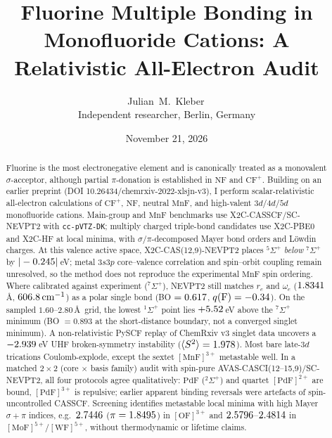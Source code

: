 \documentclass[10pt,twocolumn]{article}
\title{\textbf{Fluorine Multiple Bonding in Monofluoride Cations: A Relativistic All-Electron Audit}}
\author{Julian~M.~Kleber\,\orcidlink{0000-0001-5518-0932}\\
\small Independent researcher, Berlin, Germany}
\date{November 21, 2026}
\begin{document}

\maketitle

\begin{abstract}
Fluorine is the most electronegative element and is canonically treated as a monovalent $\sigma$-acceptor, although partial $\pi$-donation is established in $\mathrm{NF}$ and $\mathrm{CF}^+$. Building on an earlier preprint (DOI 10.26434/chemrxiv-2022-xlsjn-v3), I perform scalar-relativistic all-electron calculations of $\mathrm{CF}^+$, $\mathrm{NF}$, neutral $\mathrm{MnF}$, and high-valent $3d$/$4d$/$5d$ monofluoride cations. Main-group and $\mathrm{MnF}$ benchmarks use X2C-CASSCF/SC-NEVPT2 with \texttt{cc-pVTZ-DK}; multiply charged triple-bond candidates use X2C-PBE0 and X2C-HF at local minima, with $\sigma/\pi$-decomposed Mayer bond orders and L\"owdin charges. At this valence active space, X2C-CAS(12,9)-NEVPT2 places $^5\Sigma^+$ \emph{below} $^7\Sigma^+$ by $|-0.245|\,$eV; metal $3s3p$ core--valence correlation and spin--orbit coupling remain unresolved, so the method does not reproduce the experimental $\mathrm{MnF}$ spin ordering. Where calibrated against experiment ($^7\Sigma^+$), NEVPT2 still matches $r_e$ and $\omega_e$ ($1.8341$\,\AA, $606.8\,\mathrm{cm}^{-1}$) as a polar single bond (BO $=0.617$, $q(\mathrm{F})=-0.34$). On the sampled $1.60$--$2.80\,$\AA\ grid, the lowest $^1\Sigma^+$ point lies $+5.52\,$eV above the $^7\Sigma^+$ minimum (BO $= 0.893$ at the short-distance boundary, not a converged singlet minimum). A non-relativistic PySCF replay of ChemRxiv v3 singlet data uncovers a $-2.939\,$eV UHF broken-symmetry instability ($\langle S^2\rangle=1.978$). Most bare late-$3d$ trications Coulomb-explode, except the sextet $[\mathrm{MnF}]^{3+}$ metastable well. In a matched $2\times 2$ (core $\times$ basis family) audit with spin-pure AVAS-CASCI(12--15,9)/SC-NEVPT2, all four protocols agree qualitatively: $\mathrm{PdF}$ ($^2\Sigma^+$) and quartet $[\mathrm{PdF}]^{2+}$ are bound, $[\mathrm{PdF}]^{3+}$ is repulsive; earlier apparent binding reversals were artefacts of spin-uncontrolled CASSCF. Screening identifies metastable local minima with high Mayer $\sigma+\pi$ indices, e.g.\ $2.7446$ ($\pi=1.8495$) in $[\mathrm{OF}]^{3+}$ and $2.5796$--$2.4814$ in $[\mathrm{MoF}]^{5+}$/$[\mathrm{WF}]^{5+}$, without thermodynamic or lifetime claims.
\end{abstract}
\end{document}
